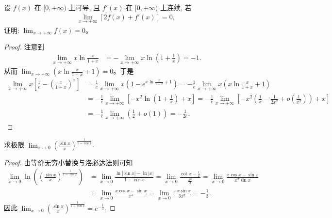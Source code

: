 \documentclass[lang=cn,newtx,10pt,scheme=chinese]{../Template/elegantbook}
\begin{document}
\begin{example}
设 $f(x)$ 在 $[0, +\infty)$ 上可导, 且 $f'(x)$ 在 $[0, +\infty)$ 上连续, 若
\begin{align*}
\lim_{x \to +\infty} [2f(x) + f'(x)] = 0,
\end{align*}
证明: $\lim_{x \to +\infty} f(x) = 0$。
\end{example}
\begin{proof}
注意到
\begin{align*}
\lim_{x \to +\infty} x \ln \frac{x}{1 + x} &= -\lim_{x \to +\infty} x \ln \left( 1 + \frac{1}{x} \right) = -1.
\end{align*}
从而 $\lim_{x \to +\infty} \left( x \ln \frac{x}{1 + x} + 1 \right) = 0$。于是
\begin{align*}
\lim_{x \to +\infty} x \left[ \frac{1}{e} - \left( \frac{x}{1 + x} \right)^x \right] &= \frac{1}{e} \lim_{x \to +\infty} x \left( 1 - e^{x \ln \frac{x}{1 + x} + 1} \right) = -\frac{1}{e} \lim_{x \to +\infty} x \left( x \ln \frac{x}{1 + x} + 1 \right) \\
&= -\frac{1}{e} \lim_{x \to +\infty} \left[ -x^2 \ln \left( 1 + \frac{1}{x} \right) + x \right] = -\frac{1}{e} \lim_{x \to +\infty} \left[ -x^2 \left( \frac{1}{x} - \frac{1}{2x^2} + o\left( \frac{1}{x^2} \right) \right) + x \right] \\
&= -\frac{1}{e} \lim_{x \to +\infty} \left( \frac{1}{2} + o\left( 1 \right) \right) = -\frac{1}{2e}.
\end{align*}

\end{proof}

\begin{example}
求极限 $\lim_{x \to 0} \left( \frac{\sin x}{x} \right)^{\frac{1}{1 - \cos x}}$.
\end{example}
\begin{proof}
由等价无穷小替换与洛必达法则可知
\begin{align*}
\lim_{x \to 0} \ln \left( \left( \frac{\sin x}{x} \right)^{\frac{1}{1 - \cos x}} \right) &= \lim_{x \to 0} \frac{\ln \left| \sin x \right| - \ln \left| x \right|}{1 - \cos x} = \lim_{x \to 0} \frac{\cot x - \frac{1}{x}}{\frac{x^2}{2}} = \lim_{x \to 0} \frac{x \cos x - \sin x}{x^2 \sin x} \\
&= \lim_{x \to 0} \frac{x \cos x - \sin x}{x^3} = \lim_{x \to 0} \frac{-x \sin x}{3x^2} = -\frac{1}{3}.
\end{align*}
因此 $\lim_{x \to 0} \left( \frac{\sin x}{x} \right)^{\frac{1}{1 - \cos x}} = e^{-\frac{1}{3}}$.

\end{proof}
\end{document}
